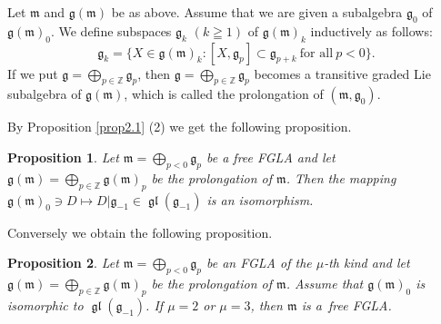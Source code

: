 \documentclass[11pt]{article}
\newtheorem{proposition}{Proposition}
\numberwithin{equation}{section}
\numberwithin{theorem}{section}
\numberwithin{proposition}{section}
\numberwithin{lemma}{section}
\numberwithin{corollary}{section}
\numberwithin{definition}{section}
\numberwithin{example}{section}
\numberwithin{remark}{section}
\numberwithin{note}{section}
\newcommand{\gl}{\operatorname{\mathfrak{gl}}}
\newcommand{\gla}[1]{\mathfrak#1=\bigoplus\limits_{p\in\mathbb Z}\mathfrak#1_p} \renewcommand{\labelenumi}{{\rm (\arabic{enumi})}}
\begin{document}
Let $\mathfrak m$ and $\mathfrak g(\mathfrak m)$ be as above.
Assume that we are given a subalgebra $\mathfrak g_0$ of
$\mathfrak g(\mathfrak m)_0$.
We def\/ine subspaces $\mathfrak g_k$ $(k\geqq 1)$ of
$\mathfrak g(\mathfrak m)_k$ inductively as follows:
\[
\mathfrak g_k=\{ X\in\mathfrak g(\mathfrak m)_k:
[X,\mathfrak g_p]\subset \mathfrak g_{p+k}\
\text{for all}\ p<0 \}.
\]
If we put $\gla g$, then
$\gla g$ becomes a transitive graded Lie subalgebra of $\mathfrak g(\mathfrak m)$,
which is called the prolongation of
$(\mathfrak m,\mathfrak g_0)$.

By Proposition \ref{prop2.1} (2) we get the following proposition.
\begin{proposition}\label{prop4.1} Let $\mathfrak m=\bigoplus\limits_{p<0}\mathfrak g_p$ be a
free FGLA and let $\mathfrak g(\mathfrak m)
=\bigoplus\limits_{p\in\mathbb Z}\mathfrak g(\mathfrak m)_p$
be the prolongation of $\mathfrak m$.
Then the mapping $\mathfrak g(\mathfrak m)_0\ni D\mapsto D|\mathfrak g_{-1}
\in\gl(\mathfrak g_{-1})$ is an isomorphism.
\end{proposition}
Conversely we obtain the following proposition.

\begin{proposition}\label{prop4.2}
Let $\mathfrak m=\bigoplus\limits_{p<0}\mathfrak g_p$ be an
FGLA of the $\mu$-th kind and let
$\mathfrak g(\mathfrak m)
=\bigoplus\limits_{p\in\mathbb Z}\mathfrak g(\mathfrak m)_p$
be the prolongation of $\mathfrak m$.
Assume that $\mathfrak g(\mathfrak m)_0$ is isomorphic to
$\gl(\mathfrak g_{-1})$.
If $\mu=2$ or $\mu=3$,
then $\mathfrak m$ is a~free FGLA.
\end{proposition}
\end{document}
